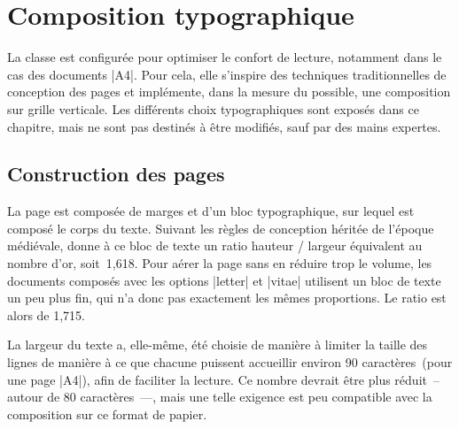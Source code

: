 \begin{noprint}
\RequirePackage{typographie}
\frenchspacing
\end{noprint}






\chapter{Composition typographique}

La classe \frenchlaw est configurée pour optimiser le confort de lecture, notamment dans le cas des documents |A4|. Pour cela, elle s'inspire des techniques traditionnelles de conception des pages et implémente, dans la mesure du possible, une composition sur grille verticale. Les différents choix typographiques sont exposés dans ce chapitre, mais ne sont pas destinés à être modifiés, sauf par des mains expertes.



\section{Construction des pages}

La page est composée de marges et d'un bloc typographique, sur lequel est composé le corps du texte. Suivant les règles de conception héritée de l'époque médiévale, \frenchlaw donne à ce bloc de texte un ratio hauteur / largeur équivalent au nombre d'or, soit~1,618. Pour aérer la page sans en réduire trop le volume, les documents composés avec les options |letter| et |vitae| utilisent un bloc de texte un peu plus fin, qui n'a donc pas exactement les mêmes proportions. Le ratio est alors de 1,715.

La largeur du texte a, elle-même, été choisie de manière à limiter la taille des lignes de manière à ce que chacune puissent accueillir environ 90 caractères~(pour une page |A4|), afin de faciliter la lecture. Ce nombre devrait être plus réduit~-- autour de 80 caractères~---, mais une telle exigence est peu compatible avec la composition sur ce format de papier.

